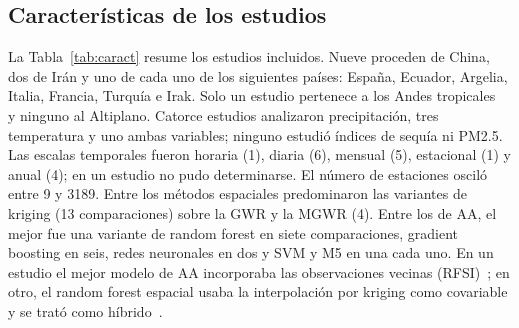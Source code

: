 \documentclass[conference]{IEEEtran}
\begin{document}
\subsection{Características de los estudios}
La Tabla~\ref{tab:caract} resume los estudios incluidos. Nueve proceden de China, dos de Irán y uno de cada uno de los siguientes países: España, Ecuador, Argelia, Italia, Francia, Turquía e Irak. Solo un estudio pertenece a los Andes tropicales~\cite{orellana2021} y ninguno al Altiplano. Catorce estudios analizaron precipitación, tres temperatura y uno ambas variables; ninguno estudió índices de sequía ni PM2.5. Las escalas temporales fueron horaria (1), diaria (6), mensual (5), estacional (1) y anual (4); en un estudio no pudo determinarse. El número de estaciones osciló entre 9 y 3189. Entre los métodos espaciales predominaron las variantes de kriging (13 comparaciones) sobre la GWR y la MGWR (4). Entre los de AA, el mejor fue una variante de random forest en siete comparaciones, gradient boosting en seis, redes neuronales en dos y SVM y M5 en una cada uno. En un estudio el mejor modelo de AA incorporaba las observaciones vecinas (RFSI)~\cite{sekulic2020}; en otro, el random forest espacial usaba la interpolación por kriging como covariable y se trató como híbrido~\cite{chen2021}.
\end{document}
